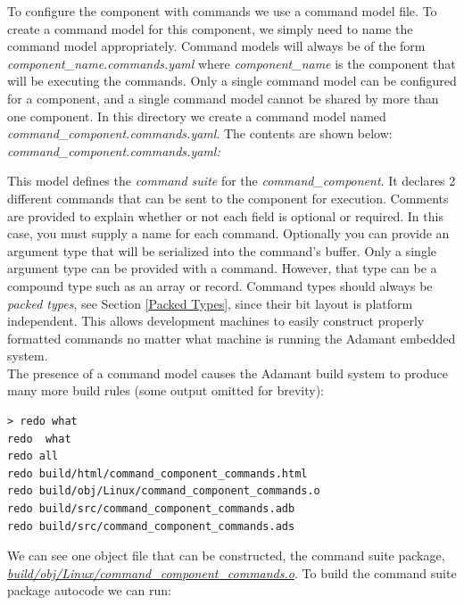 To configure the component with commands we use a command model file. To create a command model for this component, we simply need to name the command model appropriately. Command models will always be of the form \textit{component\_name.commands.yaml} where \textit{component\_name} is the component that will be executing the commands. Only a single command model can be configured for a component, and a single command model cannot be shared by more than one component. In this directory we create a command model named \textit{command\_component.commands.yaml}. The contents are shown below: \\

\textit{command\_component.commands.yaml:}

This model defines the \textit{command suite} for the \textit{command\_component}. It declares 2 different commands that can be sent to the component for execution. Comments are provided to explain whether or not each field is optional or required. In this case, you must supply a name for each command. Optionally you can provide an argument type that will be serialized into the command's buffer. Only a single argument type can be provided with a command. However, that type can be a compound type such as an array or record. Command types should always be \textit{packed types}, see Section \ref{Packed Types}, since their bit layout is platform independent. This allows development machines to easily construct properly formatted commands no matter what machine is running the Adamant embedded system. \\

The presence of a command model causes the Adamant build system to produce many more build rules (some output omitted for brevity):

\vspace{5mm} %
\begin{verbatim}
> redo what 
redo  what
redo all
redo build/html/command_component_commands.html
redo build/obj/Linux/command_component_commands.o
redo build/src/command_component_commands.adb
redo build/src/command_component_commands.ads
\end{verbatim}
\vspace{5mm} %

We can see one object file that can be constructed, the command suite package, \textit{\url{build/obj/Linux/command\_component\_commands.o}}. To build the command suite package autocode we can run:

